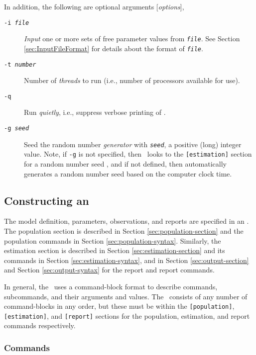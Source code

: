 In addition, the following are optional arguments [\emph{options}],

\begin{description}
\item [\texttt{-i \emph{file}}] \emph{Input} one or more sets of free parameter values from \texttt{\emph{file}}. See Section \ref{sec:InputFileFormat} for details about the format of \texttt{\emph{file}}.

\item [\texttt{-t \emph{number}}] Number of \emph{threads} to run (i.e., number of processors available for use).

\item [\texttt{-q}] Run \emph{quietly}, i.e., suppress verbose printing of \SPM.

\item [\texttt{-g \emph{seed}}]  Seed the random number \emph{generator} with \texttt{\emph{seed}}, a positive (long) integer value. Note, if \texttt{-g} is not specified, then \SPM\ looks to the \texttt{[estimation]} section for a random number seed , and if not defined, then automatically generates a random number seed based on the computer clock time.
\end{description}

\subsection{Constructing an \SPM\ \config \label{constructing-spm-config}}

The model definition, parameters, observations, and reports are specified in an \config. The  population section is described in Section \ref{sec:population-section} and the population commands in Section \ref{sec:population-syntax}. Similarly, the estimation section is described in Section \ref{sec:estimation-section} and its commands in Section \ref{sec:estimation-syntax}, and in Section \ref{sec:output-section} and Section \ref{sec:output-syntax} for the report and report commands. 

In general, the \config\ uses a command-block format to describe commands, subcommands, and their arguments and values. The \config\ consists of any number of command-blocks in any order, but these must be within the \texttt{[population]}, \texttt{[estimation]}, and  \texttt{[report]} sections for the population, estimation, and report commands respectively. 

\subsubsection{Commands}

